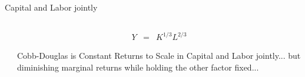 \documentclass[notes,11pt, aspectratio=169, xcolor=table]{beamer}
\begin{document}
\begin{frame}{Capital and Labor jointly}

\begin{columns}[T] %
\begin{column}{.8\textwidth}
\end{column}%
\hfill%
\begin{column}{.2\textwidth}
\begin{eqnarray*}
    Y &=& K^{1/3} L^{2/3} 
\end{eqnarray*}

Cobb-Douglas is Constant Returns to Scale in Capital and Labor jointly... but diminishing marginal returns while holding the other factor fixed...
\end{column}%
\end{columns}

\end{frame}
\end{document}

